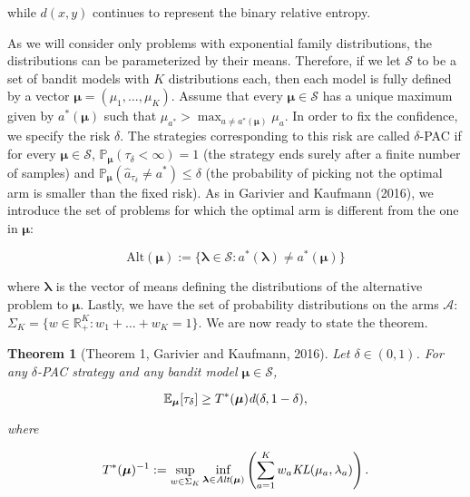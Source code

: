\documentclass[12pt,]{article}
\newtheorem{theorem}{Theorem}
\begin{document}
while \(d(x,y)\) continues to represent the binary relative entropy.

As we will consider only problems with exponential family distributions,
the distributions can be parameterized by their means. Therefore, if we
let \(\mathcal{S}\) to be a set of bandit models with \(K\)
distributions each, then each model is fully defined by a vector
\(\bm{\mu} = (\mu_1, \dots, \mu_K)\). Assume that every
\(\bm{\mu} \in \mathcal{S}\) has a unique maximum given by
\(a^*(\bm{\mu})\) such that
\(\mu_{a^*} > \max_{a \neq a^*(\bm{\mu})} \mu_a\). In order to fix the
confidence, we specify the risk \(\delta\). The strategies corresponding
to this risk are called \(\delta\)-PAC if for every
\(\bm{\mu} \in \mathcal{S}\),
\(\mathbb{P}_{\bm{\mu}}(\tau_{\delta} < \infty) = 1\) (the strategy ends
surely after a finite number of samples) and
\(\mathbb{P}_{\bm{\mu}}(\hat{a}_{\tau_{\delta}} \neq a^*) \leq \delta\)
(the probability of picking not the optimal arm is smaller than the
fixed risk). As in Garivier and Kaufmann (2016), we introduce the set of
problems for which the optimal arm is different from the one in
\(\bm{\mu}\):

\begin{equation*}
\text{Alt}(\bm{\mu}) := \{\bm{\lambda} \in \mathcal{S}: a^*(\bm{\lambda}) \neq a^*(\bm{\mu})\}
\end{equation*}

where \(\bm{\lambda}\) is the vector of means defining the distributions
of the alternative problem to \(\bm{\mu}\). Lastly, we have the set of
probability distributions on the arms \(\mathcal{A}\):
\(\Sigma_K = \{w \in \mathbb{R}_{+}^K: w_1 + \dots + w_K = 1\}\). We are
now ready to state the theorem.

\begin{theorem}[Theorem 1, Garivier and Kaufmann, 2016] \label{theorem:GarivierKaufmannTheorem1}
Let $\delta \in (0,1)$. For any $\delta$-PAC strategy and any bandit model $\bm{\mu} \in \mathcal{S}$,

\begin{equation*}
\mathbb{E}_{\bm{\mu}} [\tau_{\delta}] \geq T^*(\bm{\mu}) \text{\em{d}}(\delta,1-\delta),
\end{equation*}

where 

\begin{equation} \label{eq:GarivierKaufmann_Theorem1_Game}
T^*(\bm{\mu})^{-1} := \sup_{w \in \Sigma_K} \inf_{\bm{\lambda} \in \text{\em{Alt}}(\bm{\mu})} \left( \sum_{a=1}^K w_a \text{\em{KL}}(\mu_a, \lambda_a)\right).
\end{equation}
\end{theorem}
\end{document}

